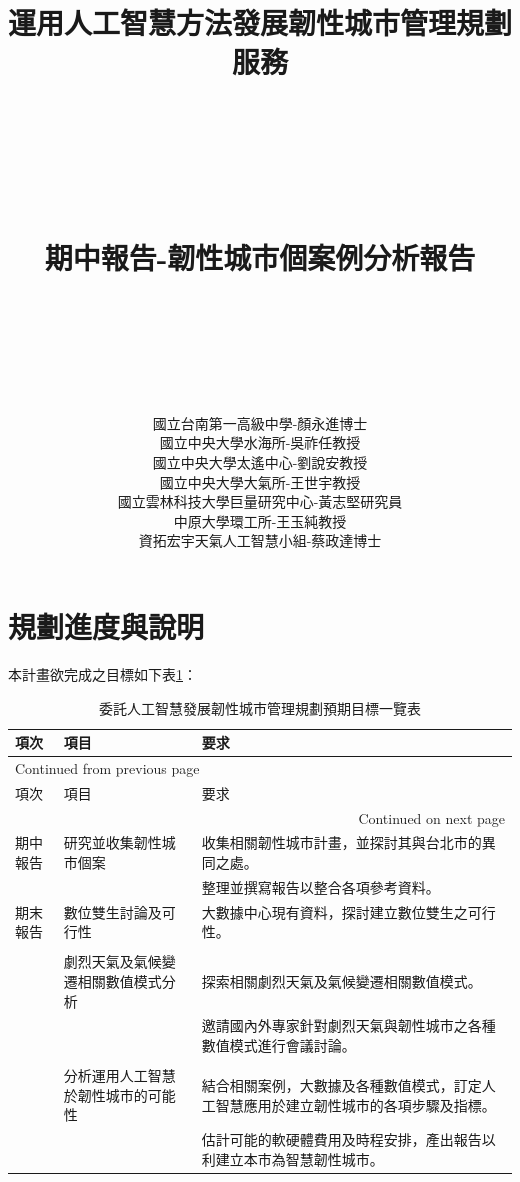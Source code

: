 \documentclass[a4paper,12pt]{article}
\author{國立台南第一高級中學-顏永進博士\\國立中央大學水海所-吳祚任教授\\國立中央大學太遙中心-劉說安教授\\國立中央大學大氣所-王世宇教授\\國立雲林科技大學巨量研究中心-黃志堅研究員\\中原大學環工所-王玉純教授\\資拓宏宇天氣人工智慧小組-蔡政達博士\newpage}
\date{}
\title{運用人工智慧方法發展韌性城市管理規劃服務\\\medskip
\large \\\\\\\\期中報告-韌性城市個案例分析報告\\\\\\\\}
\begin{document}
\maketitle
\tableofcontents

\newpage
\newpage
\section{規劃進度與說明}
\label{sec:orga0afdcc}
本計畫欲完成之目標如下表\ref{table1}：\\
\begin{longtable}{|p{0.8cm}|p{4cm}|p{12cm}|}
\caption{\label{table1}委託人工智慧發展韌性城市管理規劃預期目標一覽表}
\\
\hline
項次 & 項目 & 要求\\
\hline
\endfirsthead
\multicolumn{3}{l}{Continued from previous page} \\
\hline

項次 & 項目 & 要求 \\

\hline
\endhead
\hline\multicolumn{3}{r}{Continued on next page} \\
\endfoot
\endlastfoot
\hline
期中報告 & 研究並收集韌性城市個案 & 收集相關韌性城市計畫，並探討其與台北市的異同之處。\\
 &  & 整理並撰寫報告以整合各項參考資料。\\
\hline
期末報告 & 數位雙生討論及可行性 & 大數據中心現有資料，探討建立數位雙生之可行性。\\
 &  & \\
 & 劇烈天氣及氣候變遷相關數值模式分析 & 探索相關劇烈天氣及氣候變遷相關數值模式。\\
 &  & 邀請國內外專家針對劇烈天氣與韌性城市之各種數值模式進行會議討論。\\
 &  & \\
 & 分析運用人工智慧於韌性城市的可能性 & 結合相關案例，大數據及各種數值模式，訂定人工智慧應用於建立韌性城市的各項步驟及指標。\\
 &  & 估計可能的軟硬體費用及時程安排，產出報告以利建立本市為智慧韌性城市。\\
\hline
\end{longtable}
\newpage
\end{document}
